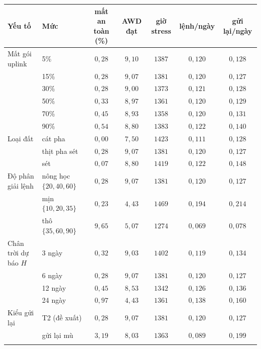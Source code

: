
\begin{tabular}{@{}llccccc@{}}
\toprule
Yếu tố & Mức & mất an toàn (\%) & AWD đạt & giờ stress & lệnh/ngày & gửi lại/ngày \\
\midrule
Mất gói uplink & 5\% & $0{,}28$ & $9{,}10$ & $1387$ & $0{,}120$ & $0{,}128$ \\
 & 15\% & $0{,}28$ & $9{,}07$ & $1381$ & $0{,}120$ & $0{,}127$ \\
 & 30\% & $0{,}28$ & $9{,}00$ & $1373$ & $0{,}121$ & $0{,}128$ \\
 & 50\% & $0{,}33$ & $8{,}97$ & $1361$ & $0{,}120$ & $0{,}129$ \\
 & 70\% & $0{,}45$ & $8{,}93$ & $1358$ & $0{,}120$ & $0{,}131$ \\
 & 90\% & $0{,}54$ & $8{,}80$ & $1383$ & $0{,}122$ & $0{,}140$ \\
\addlinespace[2pt]
Loại đất & cát pha & $0{,}00$ & $7{,}50$ & $1423$ & $0{,}111$ & $0{,}128$ \\
 & thịt pha sét & $0{,}28$ & $9{,}07$ & $1381$ & $0{,}120$ & $0{,}127$ \\
 & sét & $0{,}07$ & $8{,}80$ & $1419$ & $0{,}122$ & $0{,}148$ \\
\addlinespace[2pt]
Độ phân giải lệnh & nông học $\{20,40,60\}$ & $0{,}28$ & $9{,}07$ & $1381$ & $0{,}120$ & $0{,}127$ \\
 & mịn $\{10,20,35\}$ & $0{,}23$ & $4{,}43$ & $1469$ & $0{,}194$ & $0{,}214$ \\
 & thô $\{35,60,90\}$ & $9{,}65$ & $5{,}07$ & $1274$ & $0{,}069$ & $0{,}078$ \\
\addlinespace[2pt]
Chân trời dự báo $H$ & 3 ngày & $0{,}32$ & $9{,}03$ & $1402$ & $0{,}119$ & $0{,}134$ \\
 & 6 ngày & $0{,}28$ & $9{,}07$ & $1381$ & $0{,}120$ & $0{,}127$ \\
 & 12 ngày & $0{,}45$ & $8{,}53$ & $1342$ & $0{,}126$ & $0{,}136$ \\
 & 24 ngày & $0{,}97$ & $4{,}43$ & $1361$ & $0{,}138$ & $0{,}160$ \\
\addlinespace[2pt]
Kiểu gửi lại & T2 (đề xuất) & $0{,}28$ & $9{,}07$ & $1381$ & $0{,}120$ & $0{,}127$ \\
 & gửi lại mù & $3{,}19$ & $8{,}03$ & $1363$ & $0{,}089$ & $0{,}199$ \\
\addlinespace[2pt]
\bottomrule
\end{tabular}
